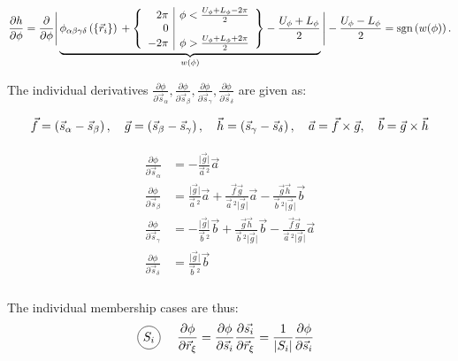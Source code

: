 \documentclass[a4paper]{article}
\newcommand*\circled[1]{
  \tikz[baseline=(char.base)]{
    \node[shape=circle,draw,inner sep=2pt] (char) {#1};
  }
}
\begin{document}
\begin{equation}
  \frac{\partial h}{\partial \phi} = \frac{\partial}{\partial \phi}
    \Bigg\lvert
      \underbrace{\phi_{\alpha\beta\gamma\delta}\left(\left\{\vec{r}_i \right\}\right){} + \left\{
        \begin{array}{r | r}
        2\pi & \phi < \frac{U_\phi + L_\phi - 2\pi}{2}\\
        0 & \\
        -2\pi & \phi > \frac{U_\phi + L_\phi + 2\pi}{2}\\
        \end{array}
      \right\}-\frac{U_\phi+ L_\phi}{2}
      }_{w(\phi)}
    \Bigg\rvert - \frac{U_\phi - L_\phi}{2}
  = \textrm{sgn}\left(w(\phi)\right).
\end{equation}

The individual derivatives $\frac{\partial\phi}{\partial\vec{s}_{\alpha}}, 
\frac{\partial\phi}{\partial\vec{s}_{\beta}}, 
\frac{\partial\phi}{\partial\vec{s}_{\gamma}}, 
\frac{\partial\phi}{\partial\vec{s}_{\delta}}$ are given as:

\begin{equation}
  \vec{f} = \left(\vec{s}_{\alpha}-\vec{s}_{\beta}\right),
  \quad\vec{g} = \left(\vec{s}_{\beta}-\vec{s}_{\gamma}\right),
  \quad\vec{h} = \left(\vec{s}_{\gamma}-\vec{s}_{\delta}\right),
  \quad\vec{a} = \vec{f} \times \vec{g},
  \quad\vec{b} = \vec{g} \times \vec{h}
\end{equation}

\begin{align}\begin{aligned}
  \frac{\partial\phi}{\partial\vec{s}_{\alpha}} &= 
    -\frac{\lvert\vec{g}\rvert}{\vec{a}\,^2}\vec{a}\\
  \frac{\partial\phi}{\partial\vec{s}_{\beta}}  &= 
    \frac{\lvert\vec{g}\rvert}{\vec{a}\,^2}\vec{a}
    + \frac{\vec{f}\vec{g}}{\vec{a}\,^2\lvert\vec{g}\rvert}\vec{a}
    - \frac{\vec{g}\vec{h}}{\vec{b}\,^2\lvert\vec{g}\rvert}\vec{b}\\
  \frac{\partial\phi}{\partial\vec{s}_{\gamma}} &= 
    - \frac{\lvert\vec{g}\rvert}{\vec{b}\,^2}\vec{b}
    + \frac{\vec{g}\vec{h}}{\vec{b}\,^2\lvert\vec{g}\rvert}\vec{b}
    - \frac{\vec{f}\vec{g}}{\vec{a}\,^2\lvert\vec{g}\rvert}\vec{a}\\
  \frac{\partial\phi}{\partial\vec{s}_{\delta}} &= 
    \frac{\lvert\vec{g}\rvert}{\vec{b}\,^2}\vec{b}\\
\end{aligned}\end{align}

The individual membership cases are thus:
\begin{align}
  \text{\circled{$S_i$}} &\quad\frac{\partial\phi}{\partial\vec{r}_{\xi}} 
    = \frac{\partial\phi}{\partial\vec{s}_{i}}
      \frac{\partial\vec{s_{i}}}{\partial\vec{r}_{\xi}}
    = \frac{1}{\lvert S_i\rvert}
      \frac{\partial\phi}{\partial\vec{s}_{i}}
\end{align}
\end{document}
